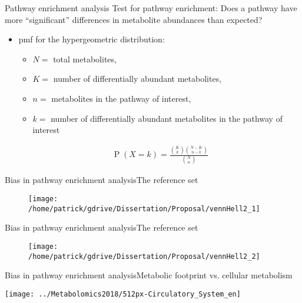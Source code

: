 \documentclass[xcolor=dvipsnames]{beamer}
\DeclareMathOperator{\PP}{P}
\begin{document}
\begin{frame}{Pathway enrichment analysis}
	\vspace{-10pt}
{\Large Test for pathway enrichment: Does a pathway have more ``significant'' differences in metabolite abundances than expected?} \vspace{10pt} \pause

	\begin{itemize}
		\item pmf for the hypergeometric distribution: 
		\begin{itemize}
			\item $N=$ total metabolites,
			\item $K=$ number of differentially abundant metabolites, 
			\item $n=$ metabolites in the pathway of interest, 
			\item $k=$ number of differentially abundant metabolites in the pathway of interest 
		\end{itemize}
		\begin{align*}
		\PP(X=k) = \frac{  {{K}\choose{k}} {{N-K}\choose{n-k}}  }{ {{N}\choose{n}} } 
		\end{align*}
	\end{itemize}
\end{frame}

\begin{frame}{Bias in pathway enrichment analysis}{The reference set}
	\vspace{-15.5pt}
	\begin{figure}
		\texttt{[image: /home/patrick/gdrive/Dissertation/Proposal/vennHell2\_1]}
	\end{figure}
\end{frame}

\begin{frame}{Bias in pathway enrichment analysis}{The reference set}
	\vspace{-15.5pt}
	\begin{figure}
		\texttt{[image: /home/patrick/gdrive/Dissertation/Proposal/vennHell2\_2]}
	\end{figure}
\end{frame}

\begin{frame}{Bias in pathway enrichment analysis}{Metabolic footprint vs. cellular metabolism}	\vspace{-10.5pt}
	\begin{center}
		\texttt{[image: ../Metabolomics2018/512px-Circulatory\_System\_en]}
	\end{center}
\end{frame}
\end{document}
